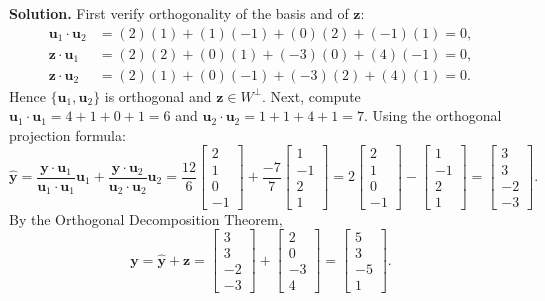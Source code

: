 \documentclass[11pt, letterpaper]{article}
\theoremstyle{definition}
\theoremstyle{remark}
\begin{document}
\textbf{Solution.}
First verify orthogonality of the basis and of $\mathbf{z}$:
\begin{align*}
\mathbf{u}_1 \cdot \mathbf{u}_2 &= (2)(1) + (1)(-1) + (0)(2) + (-1)(1) = 0, \\
\mathbf{z} \cdot \mathbf{u}_1 &= (2)(2) + (0)(1) + (-3)(0) + (4)(-1) = 0, \\
\mathbf{z} \cdot \mathbf{u}_2 &= (2)(1) + (0)(-1) + (-3)(2) + (4)(1) = 0.
\end{align*}
Hence $\{\mathbf{u}_1, \mathbf{u}_2\}$ is orthogonal and $\mathbf{z} \in W^\perp$. Next, compute $\mathbf{u}_1 \cdot \mathbf{u}_1 = 4 + 1 + 0 + 1 = 6$ and $\mathbf{u}_2 \cdot \mathbf{u}_2 = 1 + 1 + 4 + 1 = 7$. Using the orthogonal projection formula:
\[
\hat{\mathbf{y}} = \frac{\mathbf{y}\cdot\mathbf{u}_1}{\mathbf{u}_1\cdot\mathbf{u}_1}\mathbf{u}_1 + \frac{\mathbf{y}\cdot\mathbf{u}_2}{\mathbf{u}_2\cdot\mathbf{u}_2}\mathbf{u}_2 = \frac{12}{6}\begin{bmatrix} 2 \\ 1 \\ 0 \\ -1 \end{bmatrix} + \frac{-7}{7}\begin{bmatrix} 1 \\ -1 \\ 2 \\ 1 \end{bmatrix} = 2\begin{bmatrix} 2 \\ 1 \\ 0 \\ -1 \end{bmatrix} - \begin{bmatrix} 1 \\ -1 \\ 2 \\ 1 \end{bmatrix} = \begin{bmatrix} 3 \\ 3 \\ -2 \\ -3 \end{bmatrix}.
\]
By the Orthogonal Decomposition Theorem,
\[
\mathbf{y} = \hat{\mathbf{y}} + \mathbf{z} = \begin{bmatrix} 3 \\ 3 \\ -2 \\ -3 \end{bmatrix} + \begin{bmatrix} 2 \\ 0 \\ -3 \\ 4 \end{bmatrix} = \begin{bmatrix} 5 \\ 3 \\ -5 \\ 1 \end{bmatrix}.
\]
\end{document}
